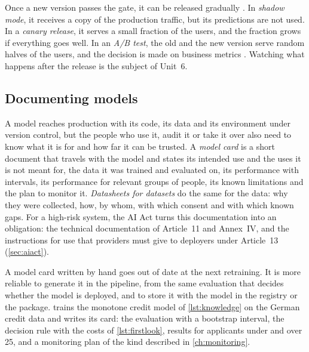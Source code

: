 Once a new version passes the gate, it can be released gradually \citep{huyen2022designing}. In \emph{shadow
mode}, it receives a copy of the production traffic, but its predictions are not used. In a \emph{canary
release}, it serves a small fraction of the users, and the fraction grows if everything goes well. In an \emph{A/B test},
the old and the new version serve random halves of the users, and the decision is made on business metrics
\citep{kohavi2020trustworthy}. Watching what happens after the release is the subject of Unit~6.

\subsection{Documenting models}\label{sec:modelcards}

A model reaches production with its code, its data and its environment under version control, but
the people who use it, audit it or take it over also need to know what it is for and how far it can
be trusted. A \emph{model card} \citep{mitchell2019model} is a short document that travels with the
model and states its intended use and the uses it is not meant for, the data it was trained and
evaluated on, its performance with intervals, its performance for relevant groups of people, its
known limitations and the plan to monitor it. \emph{Datasheets for datasets} \citep{gebru2021datasheets}
do the same for the data: why they were collected, how, by whom, with which consent and with which
known gaps. For a high-risk system, the AI Act turns this documentation into an obligation: the
technical documentation of Article~11 and Annex~IV, and the instructions for use that providers
must give to deployers under Article~13 (\cref{sec:aiact}).

A model card written by hand goes out of date at the next retraining. It is more reliable to
generate it in the pipeline, from the same evaluation that decides whether the model is deployed,
and to store it with the model in the registry or the package.  trains the
monotone credit model of \cref{lst:knowledge} on the German credit data and writes its card:
the evaluation with a bootstrap interval, the decision rule with the costs of
\cref{lst:firstlook}, results for applicants under and over 25, and a monitoring plan of the kind
described in \cref{ch:monitoring}.

